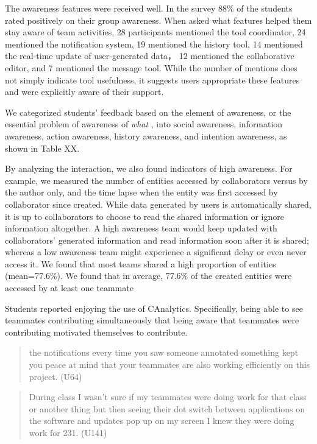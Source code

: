 The awareness features were received well. In the survey 88\% of the
students rated positively on their group awareness. When asked what
features helped them stay aware of team activities, 28 participants
mentioned the tool coordinator, 24 mentioned the notification system, 19
mentioned the history tool, 14 mentioned the real-time update of
user-generated data， 12 mentioned the collaborative editor, and 7
mentioned the message tool. While the number of mentions does not simply
indicate tool usefulness, it suggests users appropriate these features
and were explicitly aware of their support.

We categorized students' feedback based on the element of awareness, or
the essential problem of awareness of \emph{what}
\autocite{Schmidt2002}, into social awareness, information awareness,
action awareness, history awareness, and intention awareness, as shown
in Table XX.

By analyzing the interaction, we also found indicators of high
awareness. For example, we measured the number of entities accessed by
collaborators versus by the author only, and the time lapse when the
entity was first accessed by collaborator since created. While data
generated by users is automatically shared, it is up to collaborators to
choose to read the shared information or ignore information altogether.
A high awareness team would keep updated with collaborators' generated
information and read information soon after it is shared; whereas a low
awareness team might experience a significant delay or even never access
it. We found that most teams shared a high proportion of entities
(mean=77.6\%). We found that in average, 77.6\% of the created entities
were accessed by at least one teammate

Students reported enjoying the use of CAnalytics. Specifically, being
able to see teammates contributing simultaneously that being aware that
teammates were contributing motivated themselves to contribute.

\begin{quote}
	the notifications every time you saw someone annotated something kept
	you peace at mind that your teammates are also working efficiently on
	this project. (U64)
\end{quote}

\begin{quote}
	During class I wasn't sure if my teammates were doing work for that
	class or another thing but then seeing their dot switch between
	applications on the software and updates pop up on my screen I knew they
	were doing work for 231. (U141)
\end{quote}

